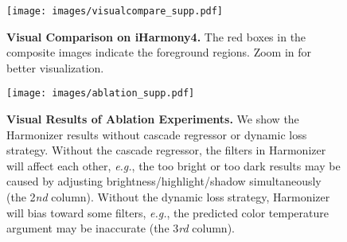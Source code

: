 \documentclass[runningheads]{llncs}
\begin{document}
\clearpage


 \begin{figure}[t]
\centering
\texttt{[image: images/visualcompare\_supp.pdf]}
{\begin{center}
\vspace{-0.5cm}
\caption{\textbf{Visual Comparison on iHarmony4.} The red boxes in the composite images indicate the foreground regions. Zoom in for better visualization.}
\label{fig:more_visual}
\end{center}
\vspace{-0.5cm}
}
\end{figure}



 \begin{figure}[h]
\centering
\texttt{[image: images/ablation\_supp.pdf]}
{\begin{center}
\vspace{-0.5cm}
\caption{\textbf{Visual Results of Ablation Experiments.} We show the Harmonizer results without cascade regressor or dynamic loss strategy. Without the cascade regressor, the filters in Harmonizer will affect each other, {\it e.g.}, the too bright or too dark results may be caused by adjusting brightness/highlight/shadow simultaneously (the 2\textit{nd} column). Without the dynamic loss strategy, Harmonizer will bias toward some filters, {\it e.g.}, the predicted color temperature argument may be inaccurate (the 3\textit{rd} column).}
\label{fig:ablation_visual}
\end{center}
\vspace{-0.5cm}
}
\end{figure}



\clearpage


\end{document}
